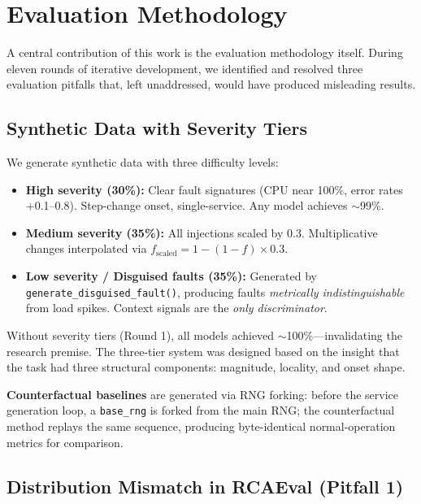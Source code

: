 \documentclass[12pt,a4paper]{report}
\begin{document}
\chapter{Evaluation Methodology}

A central contribution of this work is the evaluation methodology itself. During eleven rounds of iterative development, we identified and resolved three evaluation pitfalls that, left unaddressed, would have produced misleading results.

\section{Synthetic Data with Severity Tiers}

We generate synthetic data with three difficulty levels:

\begin{itemize}
    \item \textbf{High severity (30\%):} Clear fault signatures (CPU near 100\%, error rates +0.1--0.8). Step-change onset, single-service. Any model achieves $\sim$99\%.
    \item \textbf{Medium severity (35\%):} All injections scaled by 0.3. Multiplicative changes interpolated via $f_{\text{scaled}} = 1 - (1-f) \times 0.3$.
    \item \textbf{Low severity / Disguised faults (35\%):} Generated by \texttt{generate\_disguised\_fault()}, producing faults \textit{metrically indistinguishable} from load spikes. Context signals are the \textit{only discriminator}.
\end{itemize}

Without severity tiers (Round 1), all models achieved $\sim$100\%---invalidating the research premise. The three-tier system was designed based on the insight that the task had three structural components: magnitude, locality, and onset shape.

\textbf{Counterfactual baselines} are generated via RNG forking: before the service generation loop, a \texttt{base\_rng} is forked from the main RNG; the counterfactual method replays the same sequence, producing byte-identical normal-operation metrics for comparison.

\section{Distribution Mismatch in RCAEval (Pitfall 1)}
\end{document}
